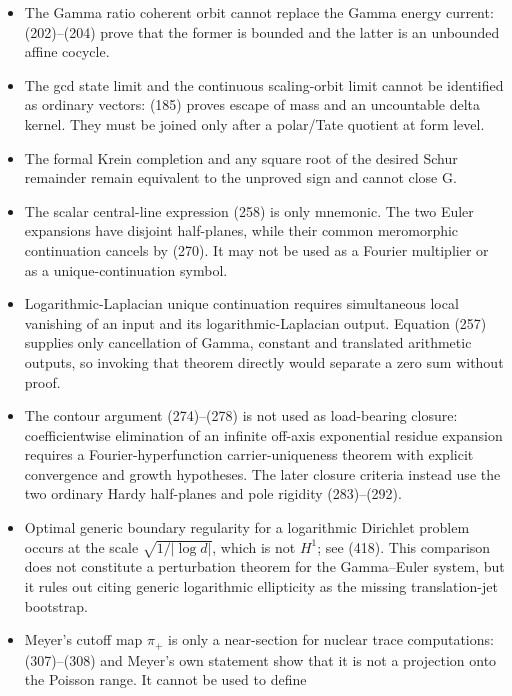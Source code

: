 \documentclass[11pt]{article}
\begin{document}
\begin{itemize}
      (177) is impossible on every nonzero compact-window source by (180),
      including on the primitive Tate subspace.
\item The Gamma ratio coherent orbit cannot replace the Gamma energy current:
      (202)--(204) prove that the former is bounded and the latter is an
      unbounded affine cocycle.
\item The gcd state limit and the continuous scaling-orbit limit cannot be
      identified as ordinary vectors: (185) proves escape of mass and an
      uncountable delta kernel.  They must be joined only after a polar/Tate
      quotient at form level.
\item The formal Krein completion and any square root of the desired Schur
      remainder remain equivalent to the unproved sign and cannot close G.
\item The scalar central-line expression (258) is only mnemonic.  The two
      Euler expansions have disjoint half-planes, while their common
      meromorphic continuation cancels by (270).  It may not be used as a
      Fourier multiplier or as a unique-continuation symbol.
\item Logarithmic-Laplacian unique continuation requires simultaneous local
      vanishing of an input and its logarithmic-Laplacian output.  Equation
      (257) supplies only cancellation of Gamma, constant and translated
      arithmetic outputs, so invoking that theorem directly would separate
      a zero sum without proof.
\item The contour argument (274)--(278) is not used as load-bearing closure:
      coefficientwise elimination of an infinite off-axis exponential
      residue expansion requires a Fourier-hyperfunction carrier-uniqueness
      theorem with explicit convergence and growth hypotheses.  The later
      closure criteria instead use the two ordinary Hardy half-planes and
      pole rigidity (283)--(292).
\item Optimal generic boundary regularity for a logarithmic Dirichlet
      problem occurs at the scale $\sqrt{1/|\log d|}$, which is not $H^1$;
      see (418).  This comparison does not constitute a perturbation theorem
      for the Gamma--Euler system, but it rules out citing generic
      logarithmic ellipticity as the missing translation-jet bootstrap.
\item Meyer's cutoff map $\pi_+$ is only a near-section for nuclear trace
      computations: (307)--(308) and Meyer's own statement show that it is
      not a projection onto the Poisson range.  It cannot be used to define

\end{itemize}
\end{document}
